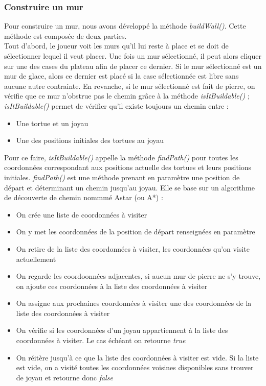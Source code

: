 \documentclass{article}
\begin{document}
		\subsubsection{Construire un mur}
Pour construire un mur, nous avons développé la méthode \textit{buildWall()}.
Cette méthode est composée de deux parties.
\\
Tout d'abord, le joueur voit les murs qu'il lui reste à place et se doit de sélectionner lequel il veut placer. Une fois un mur sélectionné, il peut alors cliquer sur une des cases du plateau afin de placer ce dernier. Si le mur sélectionné est un mur de glace, alors ce dernier est placé si la case sélectionnée est libre sans aucune autre contrainte. En revanche, si le mur sélectionné est fait de pierre, on vérifie que ce mur n'obstrue pas le chemin grâce à la méthode \textit{isItBuildable()} ; \textit{isItBuildable()} permet de vérifier qu'il existe toujours un chemin entre :
\begin{itemize}
\item Une tortue et un joyau
\item Une des positions initiales des tortues au joyau
\end{itemize}
\smallbreak
\indent Pour ce faire, \textit{isItBuildable()} appelle la méthode \textit{findPath()} pour toutes les coordonnées correspondant aux positions actuelle des tortues et leurs positions initiales. \textit{findPath()} est une méthode prenant en paramètre une position de départ et déterminant un chemin jusqu'au joyau. Elle se base sur un algorithme de découverte de chemin nommmé Astar (ou A*) :
\begin{itemize}
\item On crée une liste de coordonnées à visiter
\item On y met les coordonnées de la position de départ renseignées en paramètre
\item On retire de la liste des coordonnées à visiter, les coordonnées qu'on visite actuellement
\item On regarde les coordoonnées adjacentes, si aucun mur de pierre ne s'y trouve, on ajoute ces coordonnées à la liste des coordonnées à visiter
\item On assigne aux prochaines coordonnées à visiter une des coordonnées de la liste des coordonnées à visiter
\item On vérifie si les coordonnées d'un joyau appartiennent à la liste des coordonnées à visiter. Le cas échéant on retourne \textit{true}
\item On réitère jusqu'à ce que la liste des coordonnées à visiter est vide. Si la liste est vide, on a visité toutes les coordonnées voisines disponibles sans trouver de joyau et retourne donc \textit{false}
\end{itemize}
\end{document}
